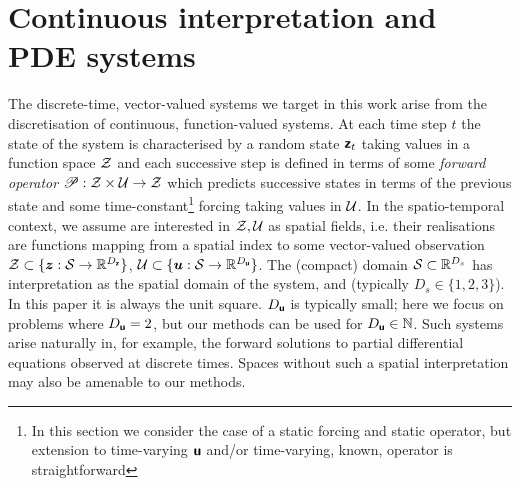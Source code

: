 
\fi

\section{Continuous interpretation and PDE systems}\label{app:basis-functions}
The discrete-time, vector-valued systems we target in this work arise from the discretisation of continuous, function-valued systems.
At each time step \(t\) the state of the system is characterised by a random state \(\boldsymbol{\mathsf{z}}_{t}\) taking values in a function space \(\mathcal{Z}\)
and each successive step is defined in terms of some \emph{forward operator} \(\mathscr{P}:\mathcal{Z}\times  \mathcal{U} \to \mathcal{Z}\)
which predicts successive states in terms of the previous state and some time-constant\footnote{In this section we consider the case of a static forcing and static operator, but extension to time-varying  \(\boldsymbol{\mathsf{u}}\) and/or time-varying, known, operator is straightforward} forcing taking values in \( \mathcal{U}\).
In the spatio-temporal context, we assume are interested in \(\mathcal{Z},\mathcal{U}\) as spatial fields, i.e. their realisations are functions mapping from a spatial index to some vector-valued observation
\(\mathcal{Z}\subset \{\boldsymbol{z}:\mathcal{S}\to\mathbb{R}^{D_{\boldsymbol{\mathsf{z}}}}\}\),
\(\mathcal{U}\subset\{\boldsymbol{u}:\mathcal{S}\to\mathbb{R}^{D_{\boldsymbol{\mathsf{u}}}}\}\).
The (compact) domain \(\mathcal{S}\subset \mathbb{R}^{D_s}\) has interpretation as the spatial domain of the system, and (typically \(D_s \in \{1,2,3\}\)).
In this paper it is always the unit square.
\(D_{\boldsymbol{\mathsf{u}}}\) is typically small; here we focus on problems where $D_{\boldsymbol{\mathsf{u}}} = 2$, but our methods can be used for $D_{\boldsymbol{\mathsf{u}}} \in \mathbb{N}$.
Such systems arise naturally in, for example, the forward solutions to partial differential equations observed at discrete times.
Spaces without such a spatial interpretation may also be amenable to our methods.

